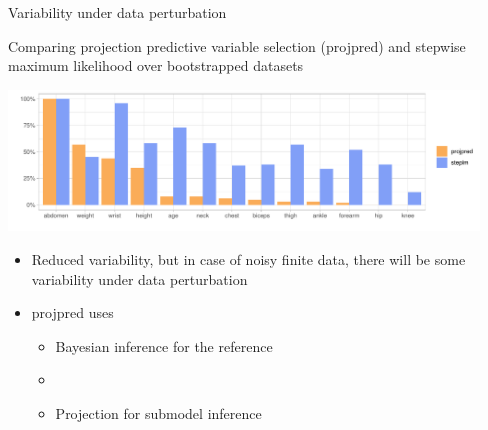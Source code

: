\documentclass[t]{beamer}
\begin{document}
  \begin{frame}{Variability under data perturbation}

   Comparing projection predictive variable selection (projpred)
    and stepwise maximum likelihood over bootstrapped datasets

  
  \vspace{-0.5\baselineskip}
  \begin{minipage}[t]{1\linewidth}
      \hspace{-1cm}
      \includegraphics[width=12.5cm]{inc_prob.pdf}
    \end{minipage}
  
    \begin{itemize}
      \vspace{-1\baselineskip}
    \item<1-> Reduced variability, but in case of noisy finite data,
      there will be some variability under data perturbation
    \item<2-> projpred uses
      \begin{itemize}
      \item Bayesian inference for the reference
      \item {}
      \item Projection for submodel inference
      \end{itemize}
    \end{itemize}

  \end{frame}


\end{document}
